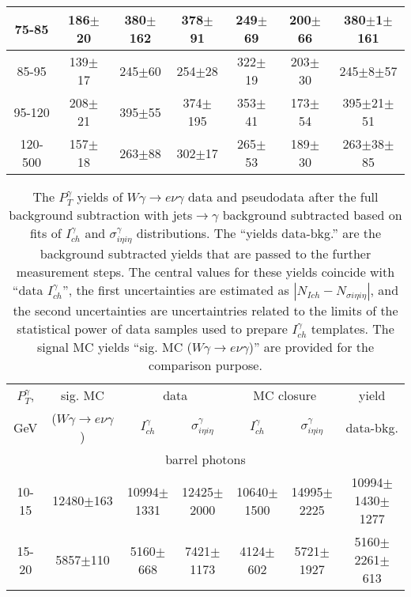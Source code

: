 \begin{table}[h]
\begin{center}
\begin{tabular}{|c|c|c|c|c|c|c|}
    75-85 & 186$\pm$20 & 380$\pm$162 & 378$\pm$91 & 249$\pm$69 & 200$\pm$66 &380$\pm$1$\pm$161  \\ \hline
    85-95 & 139$\pm$17 & 245$\pm$60 & 254$\pm$28 & 322$\pm$19 & 203$\pm$30 &245$\pm$8$\pm$57  \\ \hline
    95-120 & 208$\pm$21 & 395$\pm$55 & 374$\pm$195 & 353$\pm$41 & 173$\pm$54 &395$\pm$21$\pm$51  \\ \hline
    120-500 & 157$\pm$18 & 263$\pm$88 & 302$\pm$17 & 265$\pm$53 & 189$\pm$30 &263$\pm$38$\pm$85  \\ \hline
  \end{tabular}
  \label{tab:diff_ways_to_fit_phoEt_muon}
  \end{center}
\end{table}

\begin{table}[h]
  \tiny
  \begin{center}
  \caption{The $P_T^{\gamma}$ yields of $W\gamma\rightarrow e\nu\gamma$ data and pseudodata after the full background subtraction with jets$\rightarrow\gamma$ background subtracted based on fits of $I_{ch}^{\gamma}$ and  $\sigma_{i\eta i\eta}^\gamma$ distributions. The ``yields data-bkg.'' are the background subtracted yields that are passed to the further measurement steps. The central values for these yields coincide with ``data $I_{ch}^{\gamma}$'', the first uncertainties are estimated as $|N_{Ich}-N_{\sigma i\eta i\eta}|$, and the second uncertainties are uncertaintries related to the limits of the statistical power of data samples used to prepare $I_{ch}^{\gamma}$ templates. The signal MC yields ``sig. MC ($W\gamma\rightarrow e\nu\gamma$)'' are provided for the comparison purpose.}
  \begin{tabular}{|c|c|c|c|c|c|c|}
    \hline
    $P_T^{\gamma}$, &  sig. MC   & \multicolumn{2}{|c|}{data}  & \multicolumn{2}{|c|}{MC closure} & yield\\ 
    GeV & ($W\gamma\rightarrow e\nu\gamma$) & $I_{ch}^{\gamma}$ & $\sigma_{i\eta i\eta}^\gamma$  & $I_{ch}^{\gamma}$  & $\sigma_{i\eta i\eta}^\gamma$   & data-bkg. \\ \hline
    \multicolumn{7}{|c|}{barrel photons} \\ \hline
    10-15 & 12480$\pm$163 & 10994$\pm$1331 & 12425$\pm$2000 & 10640$\pm$1500 & 14995$\pm$2225 &10994$\pm$1430$\pm$1277  \\ \hline
    15-20 & 5857$\pm$110 & 5160$\pm$668 & 7421$\pm$1173 & 4124$\pm$602 & 5721$\pm$1927 &5160$\pm$2261$\pm$613  \\ \hline

\end{tabular}
\end{center}
\end{table}
